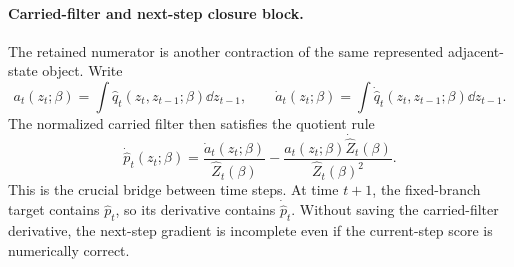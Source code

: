 \paragraph{Carried-filter and next-step closure block.}
The retained numerator is another contraction of the same represented
adjacent-state object.  Write
\begin{equation}
  a_t(z_t;\beta)=
  \int \widehat q_t(z_t,z_{t-1};\beta)\dd z_{t-1},
  \qquad
  \dot a_t(z_t;\beta)=
  \int \dot{\widehat q}_t(z_t,z_{t-1};\beta)\dd z_{t-1}.
  \label{eq:bf-hd-ttkr-carried-numerator}
\end{equation}
The normalized carried filter then satisfies the quotient rule
\begin{equation}
  \dot{\widehat p}_t(z_t;\beta)=
  \frac{\dot a_t(z_t;\beta)}{\widehat Z_t(\beta)}
  -
  \frac{a_t(z_t;\beta)\dot{\widehat Z}_t(\beta)}{\widehat Z_t(\beta)^2}.
  \label{eq:bf-hd-ttkr-dot-carried-filter}
\end{equation}
This is the crucial bridge between time steps.  At time \(t+1\), the fixed-branch
target contains \(\widehat p_t\), so its derivative contains
\(\dot{\widehat p}_t\).  Without saving the carried-filter derivative, the
next-step gradient is incomplete even if the current-step score is numerically
correct.

